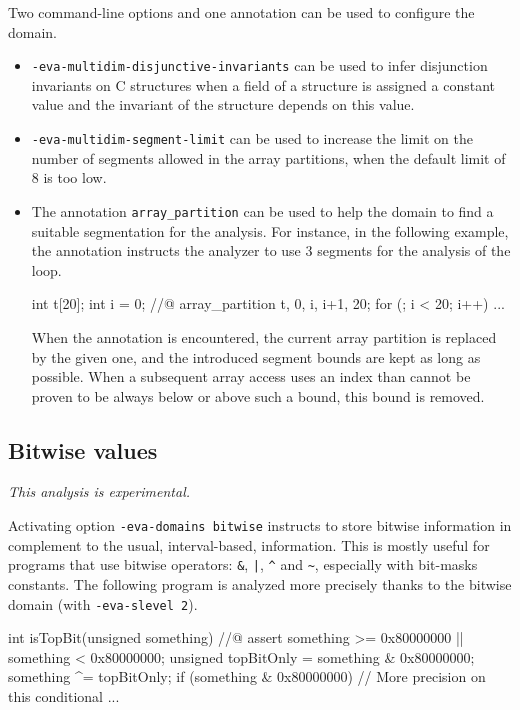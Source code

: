 \documentclass{frama-c-book}
\begin{document}
Two command-line options and one annotation can be used to configure the
domain.
\begin{itemize}
  \item {\tt -eva-multidim-disjunctive-invariants} can be used to infer
        disjunction invariants on C structures when a field of a structure is
        assigned a constant value and the invariant of the structure depends on
        this value.
  \item {\tt -eva-multidim-segment-limit} can be used to increase the limit on
        the number of segments allowed in the array partitions, when the default
        limit of 8 is too low.
  \item The annotation {\tt array\_partition} can be used to help the domain
        to find a suitable segmentation for the analysis. For instance, in
        the following example, the annotation instructs the analyzer to use
        3 segments for the analysis of the loop.
\begin{listing-nonumber}
int t[20];
int i = 0;
//@ array_partition t, 0, i, i+1, 20;
for (; i < 20; i++) {
  ...
}
\end{listing-nonumber}
        When the annotation is encountered, the current array partition is
        replaced by the given one, and the introduced segment bounds are kept
        as long as possible. When a subsequent array access uses an index than
        cannot be proven to be always below or above such a bound, this
        bound is removed.
\end{itemize}


\subsection{Bitwise values}
\label{sec:bitwise}

\emph{This analysis is experimental.}

Activating option \texttt{-eva-domains bitwise} instructs \Eva{} to store
bitwise information in complement to the usual, interval-based, information.
This is mostly useful for programs that use bitwise operators: \verb+&+,
\verb+|+, \verb+^+ and \verb+~+, especially with bit-masks constants.
The following program is analyzed more precisely thanks to the bitwise
domain (with \lstinline+-eva-slevel 2+).
\begin{listing-nonumber}
int isTopBit(unsigned something)
{
  //@ assert something >= 0x80000000 || something < 0x80000000;
  unsigned topBitOnly = something & 0x80000000;
  something ^= topBitOnly;
  if (something & 0x80000000) // More precision on this conditional { ... }
}
\end{listing-nonumber}
\end{document}
